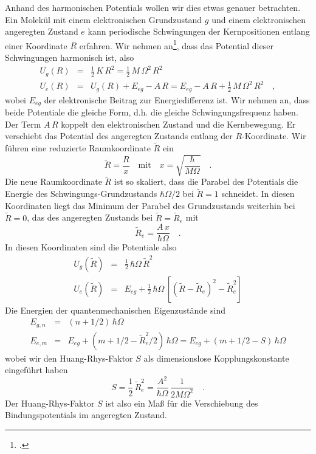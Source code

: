 Anhand des harmonischen Potentials wollen wir dies etwas genauer betrachten. Ein Molekül mit einem elektronischen Grundzustand $g$ und einem elektronischen angeregten Zustand $e$ kann periodische Schwingungen der Kernpositionen entlang einer Koordinate $R$ erfahren. 
Wir nehmen an\footcite{Kuzmany}, dass das Potential dieser Schwingungen harmonisch ist, also
\begin{eqnarray}
 U_g(R) &=& \frac{1}{2} \, K \, R^2 = \frac{1}{2} \, M \, \Omega^2 \, R^2 \\
  U_e(R) &=&  U_g(R) + E_{eg} - A \, R = E_{eg}  - A \, R + \frac{1}{2} \, M \, \Omega^2 \, R^2  \quad ,
 \end{eqnarray}
wobei $E_{eg}$ der elektronische Beitrag zur Energiedifferenz ist. Wir nehmen an, dass beide Potentiale die gleiche Form, d.h. die gleiche Schwingungsfrequenz haben. Der Term $A \, R$ koppelt den elektronischen Zustand und die Kernbewegung. Er verschiebt das Potential des angeregten Zustands entlang der $R$-Koordinate. 
%
Wir führen eine reduzierte Raumkoordinate $\tilde{R}$ ein
\begin{equation}
\tilde{R} = \frac{R}{x} \quad \text{mit} \quad x = \sqrt{\frac{\hbar}{M \Omega}}  \quad .
\end{equation}
Die neue Raumkoordinate $\tilde{R}$ ist so skaliert, dass die Parabel des Potentials die Energie des Schwingungs-Grundzustands $\hbar \Omega/2$ bei $\tilde{R} = 1$ schneidet.
In diesen Koordinaten liegt das Minimum der Parabel des Grundzustands weiterhin bei 
$\tilde{R}  = 0$, das des
angeregten Zustands bei $\tilde{R} = \tilde{R}_e$ mit
\begin{equation}
\tilde{R}_e = \frac{A \, x}{ \hbar \Omega} \quad .
\end{equation}
In diesen Koordinaten sind die Potentiale also
\begin{eqnarray}
 U_g(\tilde{R}) &=& \frac{1}{2}  \, \hbar \Omega \, \tilde{R}^2 \\
  U_e(\tilde{R}) &=&   E_{eg} + \frac{1}{2}  \, \hbar \Omega  \, \left[  (\tilde{R} - \tilde{R}_e)^2 - \tilde{R}_e^2  \right]
 \end{eqnarray}
Die Energien der quantenmechanischen Eigenzustände sind 
\begin{eqnarray}
  E_{g, n} &=&  (n + 1/2) \, \hbar \Omega  \\
  E_{e, m} &=&   E_{eg} +   (m + 1/2 - \tilde{R}_e^2  /2 ) \, \hbar \Omega  =  E_{eg} +   (m + 1/2 - S ) \, \hbar \Omega   \nonumber
\end{eqnarray}
wobei wir den  Huang-Rhys-Faktor $S$ als dimensionslose Kopplungskonstante eingeführt  haben
\begin{equation}
 S = \frac{1}{2} \, \tilde{R}_e^2  =
 \frac{A^2}{\hbar \Omega}  \, \frac{1}{2 M \Omega^2} \quad. 
\end{equation}
Der  Huang-Rhys-Faktor $S$ ist also ein Maß für die Verschiebung des Bindungspotentials im angeregten Zustand.




